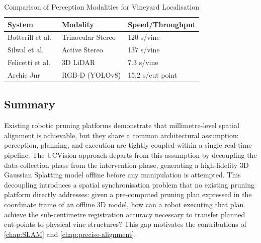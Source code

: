 \begin{table}[h]
\centering
\caption{Comparison of Perception Modalities for Vineyard Localisation}
\label{tab:perception}
\begin{tabularx}{\textwidth}{|X|l|l|}
\hline
\textbf{System} & \textbf{Modality} & \textbf{Speed/Throughput} \\ \hline
Botterill et al.~\cite{botterillRobotSystemPruning2017} & Trinocular Stereo & 120 s/vine \\ \hline
Silwal et al.~\cite{silwalRobustIlluminationInvariantCamera2021} & Active Stereo & 137 s/vine \\ \hline
Felicetti et al.~\cite{felicettiTractorMountedGrapevine2025} & 3D LiDAR & 7.3 s/vine \\ \hline
Archie Jnr~\cite{navoneAutonomousRoboticPruning2025} & RGB-D (YOLOv8) & 15.2 s/cut point \\ \hline
\end{tabularx}
\end{table}

\subsection{Summary}
\label{subsec:vineyard-pruning-summary}

Existing robotic pruning platforms demonstrate that millimetre-level spatial alignment is achievable, but they share a common architectural assumption: perception, planning, and execution are tightly coupled within a single real-time pipeline. The UCVision approach departs from this assumption by decoupling the data-collection phase from the intervention phase, generating a high-fidelity 3D Gaussian Splatting model offline before any manipulation is attempted. This decoupling introduces a spatial synchronisation problem that no existing pruning platform directly addresses: given a pre-computed pruning plan expressed in the coordinate frame of an offline 3D model, how can a robot executing that plan achieve the sub-centimetre registration accuracy necessary to transfer planned cut-points to physical vine structures? This gap motivates the contributions of \cref{chap:SLAM} and \cref{chap:precise-alignment}.

